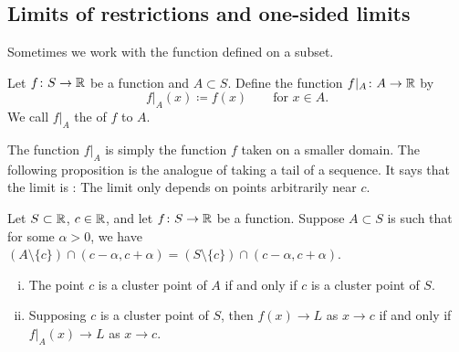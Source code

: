 \subsection{Limits of restrictions and one-sided limits}

Sometimes we work with the function defined on a subset.

\begin{defn}
Let $f \colon S \to {\mathbb{R}}$ be a function and $A \subset S$.  Define the
function $f|_A \colon A \to {\mathbb{R}}$ by
\begin{equation*}
f|_A (x) \coloneqq f(x)  \qquad \text{for } x \in A.
\end{equation*}
We call $f|_A$ the \emph{} of $f$ to $A$.
\end{defn}

The function $f|_A$ is simply the function $f$ taken on a smaller domain.
The following proposition is the analogue of taking a tail of a sequence.
It says that the limit is : The limit only depends on points
arbitrarily near $c$.

\begin{prop} \label{prop:limrest}
Let $S \subset {\mathbb{R}}$, $c \in {\mathbb{R}}$, and
let $f \colon S
\to {\mathbb{R}}$ be a function.
Suppose
$A \subset S$ is such that for some $\alpha > 0$, we have
$(A \setminus \{ c \}) \cap (c-\alpha,c+\alpha) = (S \setminus \{ c \}) \cap (c-\alpha,c+\alpha)$.
\begin{enumerate}[(i)]
\item The point $c$ is a cluster point of $A$ if and only if $c$ is a cluster point
of $S$.
\item Supposing $c$ is a cluster point of $S$, then $f(x) \to L$ as $x \to c$ if and only if
$f|_A(x) \to L$ as $x \to c$.
\end{enumerate}
\end{prop}

